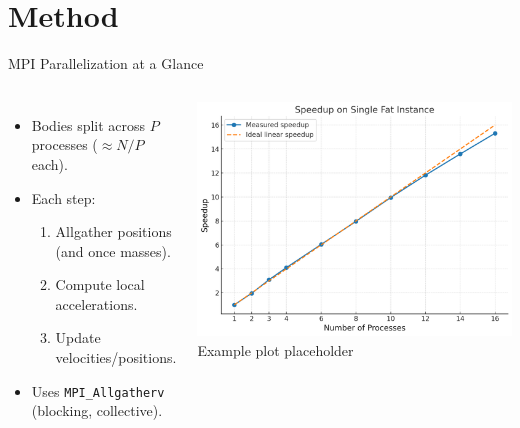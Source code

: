 \documentclass{beamer}
\begin{document}
\section{Method}
\begin{frame}{MPI Parallelization at a Glance}
  \begin{columns}[T,totalwidth=\textwidth]
    \begin{itemize}
      \item Bodies split across $P$ processes ($\approx N/P$ each).
      \item Each step:
      \begin{enumerate}
        \item Allgather positions (and once masses).
        \item Compute local accelerations.
        \item Update velocities/positions.
      \end{enumerate}
      \item Uses \texttt{MPI\_Allgatherv} (blocking, collective).
    \end{itemize}
    \includegraphics[width=\linewidth]{parallel_strong_scaling_16_cores.png}
    \vspace{0.3em}
    \scriptsize Example plot placeholder
  \end{columns}
\end{frame}
\end{document}
